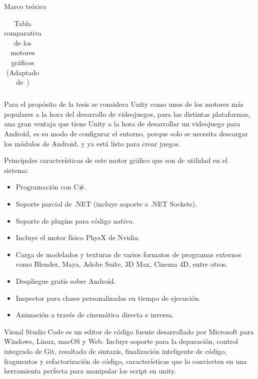 \begin{thesischapter}{1} {Marco teórico}
\begin{table}[ht]
\begin{tabularx}{\textwidth}{|X|X|X|X|X|X|X|}
        \end{tabularx}
        \label{tab: graphics-engines}
        \caption{ Tabla comparativa de los motores gráficos \\ (Adaptado de~\cite{gonjar2019desarrollo})}
    \end{table}
    
    
    \vspace{10pt}
    Para el propósito de la tesis se considera Unity como unos de los motores más populares a la hora del desarrollo de videojuegos, para las distintas plataformas, una gran ventaja que tiene Unity a la hora de desarrollar un videojuego para Android, es su modo de configurar el entorno, porque solo se necesita descargar los módulos de Android, y ya está listo para crear juegos.

    \vspace{5pt}
    Principales características de este motor gráfico que son de utilidad en el sistema:~\cite{unity3d}

    \begin{itemize}
        \item Programación con C\#.
        \item Soporte parcial de .NET (incluye soporte a .NET Sockets).
        \item Soporte de plugins para código nativo.
        \item Incluye el motor físico PhysX de Nvidia.
        \item Carga de modelados y texturas de varios formatos de programas externos como Blender, Maya, Adobe Suite, 3D Max, Cinema 4D, entre otros.
        \item Despliegue gratis sobre Android.
        \item Inspector para clases personalizadas en tiempo de ejecución.
        \item Animación a través de cinemática directa e inversa.
    \end{itemize}

    Visual Studio Code es un editor de código fuente desarrollado por Microsoft para Windows, Linux, macOS y Web. Incluye soporte para la depuración, control integrado de Git, resaltado de sintaxis, finalización inteligente de código, fragmentos y refactorización de código, características que lo convierten en una herramienta perfecta para manipular los script en unity.~\cite{vscode}


\end{thesischapter}

